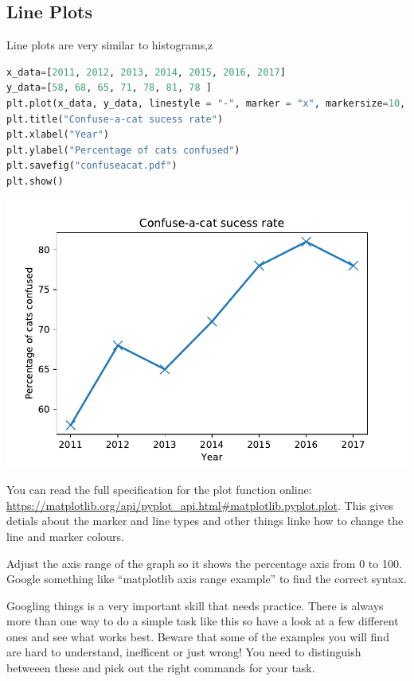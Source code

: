 	\subsection{Line Plots}
		Line plots are very similar to histograms,z
		\begin{lstlisting}[language=Python]
x_data=[2011, 2012, 2013, 2014, 2015, 2016, 2017]
y_data=[58, 68, 65, 71, 78, 81, 78 ]
plt.plot(x_data, y_data, linestyle = "-", marker = "x", markersize=10, linewidth=2)
plt.title("Confuse-a-cat sucess rate")
plt.xlabel("Year")
plt.ylabel("Percentage of cats confused")
plt.savefig("confuseacat.pdf")
plt.show()\end{lstlisting}
		\includegraphics[scale=0.8]{images/confuseacat}

You can read the full specification for the plot function online: \url{https://matplotlib.org/api/pyplot_api.html#matplotlib.pyplot.plot}. This gives detials about the marker and line types and other things linke how to change the line and marker colours.
\begin{task}Adjust the axis range of the graph so it shows the percentage axis from 0 to 100. Google something like ``matplotlib axis range example'' to find the correct syntax.\end{task}
Googling things is a very important skill that needs practice. There is always more than one way to do a simple task like this so have a look at a few different ones and see what works best. Beware that some of the examples you will find are hard to understand, inefficent or just wrong! You need to distinguish betweeen these and pick out the right commands for your task.